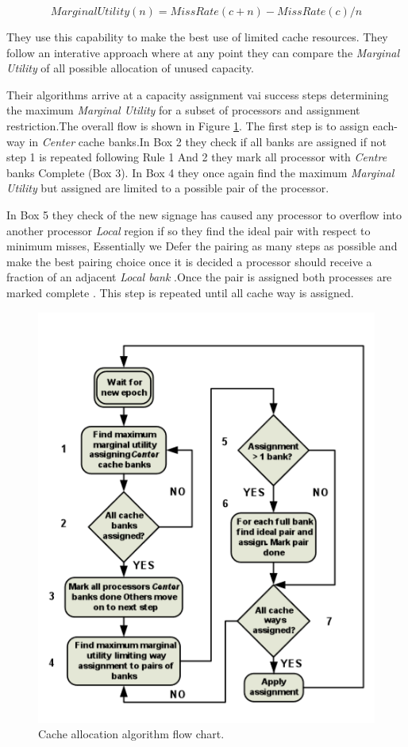 \documentclass{report}
\begin{document}
$$MarginalUtility(n) = MissRate(c+n)-MissRate(c)/n$$
\vspace{.8cm}


They use this capability to make the best use of limited cache resources. They follow an interative approach where at any point they can compare the \emph{Marginal Utility} of all possible allocation of unused capacity.\vspace{.8cm}

Their algorithms arrive at a capacity assignment vai success steps determining the maximum  \emph{Marginal Utility} for a subset of processors and assignment restriction.The overall flow is shown in Figure \ref{fig23}. The first step is to assign each-way in \emph{Center} cache banks.In Box 2 they check if all banks are assigned if not step 1 is repeated following Rule 1 And 2 they mark all processor with \emph{Centre} banks Complete (Box 3). In Box 4 they once again find the maximum \emph{Marginal Utility} but assigned are limited to a possible pair of the processor.\vspace{.8cm}

 In Box 5 they check of the new signage has caused any processor to overflow into another processor  \emph{Local} region if so they find the ideal pair with respect to minimum misses, Essentially we Defer the pairing as many steps as possible and make the best pairing choice once it  is decided a processor should receive a fraction of an adjacent \emph{Local bank} .Once the pair is assigned both processes are marked complete  . This step is repeated until all cache  way is assigned.
\begin{figure}[h!]
\includegraphics[width=.8\textwidth]{./fig23}
\caption{Cache allocation algorithm flow chart.}
\label{fig23}
\end{figure}
\end{document}
